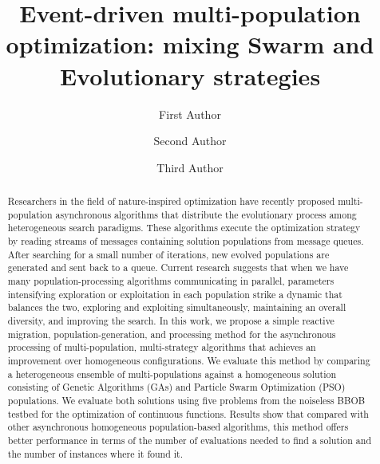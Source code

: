 \documentclass[runningheads]{llncs}
\begin{document}
\title{Event-driven multi-population optimization: mixing Swarm and
  Evolutionary strategies}
\author{First Author \and
Second Author \and
Third Author}
%

%
\maketitle              %
%
\begin{abstract}

Researchers in the field of nature-inspired optimization have recently
proposed multi-population asynchronous algorithms that distribute the
evolutionary process among heterogeneous search paradigms. These
algorithms execute the optimization strategy by reading streams of
messages containing solution populations from message queues. After
searching for a small number of iterations, new evolved populations
are generated and sent back to a queue. Current research suggests that
when we have many population-processing algorithms communicating in
parallel, parameters intensifying exploration or exploitation in each
population strike a dynamic that balances the two, exploring and
exploiting simultaneously, maintaining an overall diversity, and
improving the search.  In this work, we propose a simple reactive
migration, population-generation, and processing method for
the asynchronous processing of multi-population, multi-strategy
algorithms that achieves an improvement over homogeneous
configurations. We evaluate this method by comparing a heterogeneous
ensemble of multi-populations against a homogeneous solution
consisting of Genetic Algorithms (GAs) and Particle Swarm Optimization
(PSO) populations. We evaluate both solutions using five problems from
the noiseless BBOB testbed for the optimization of continuous
functions. Results show that compared with other asynchronous
homogeneous population-based algorithms, this method offers better
performance in terms of the number of evaluations needed to find a
solution and the number of instances where it found it.

\end{abstract}
%
%
%
\end{document}
